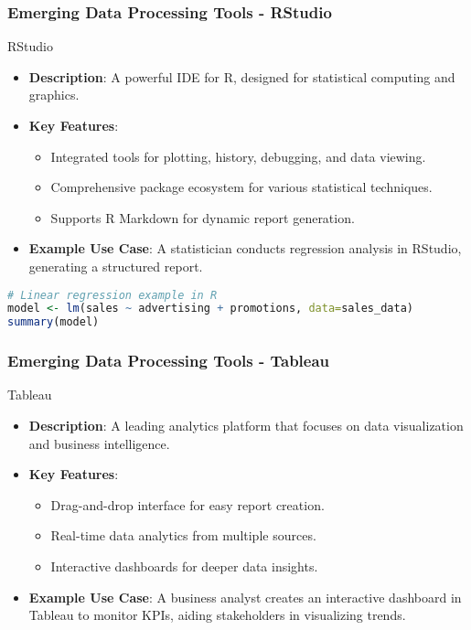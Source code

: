 \documentclass[aspectratio=169]{beamer}
\begin{document}
\begin{frame}[fragile]
    \frametitle{Emerging Data Processing Tools - RStudio}
    \begin{block}{RStudio}
        \begin{itemize}
            \item \textbf{Description}: A powerful IDE for R, designed for statistical computing and graphics.
            \item \textbf{Key Features}:
                \begin{itemize}
                    \item Integrated tools for plotting, history, debugging, and data viewing.
                    \item Comprehensive package ecosystem for various statistical techniques.
                    \item Supports R Markdown for dynamic report generation.
                \end{itemize}
            \item \textbf{Example Use Case}:
                A statistician conducts regression analysis in RStudio, generating a structured report.
        \end{itemize}
    \end{block}
    \begin{lstlisting}[language=R, caption=RStudio Example]
# Linear regression example in R
model <- lm(sales ~ advertising + promotions, data=sales_data)
summary(model)
    \end{lstlisting}
\end{frame}

\begin{frame}[fragile]
    \frametitle{Emerging Data Processing Tools - Tableau}
    \begin{block}{Tableau}
        \begin{itemize}
            \item \textbf{Description}: A leading analytics platform that focuses on data visualization and business intelligence.
            \item \textbf{Key Features}:
                \begin{itemize}
                    \item Drag-and-drop interface for easy report creation.
                    \item Real-time data analytics from multiple sources.
                    \item Interactive dashboards for deeper data insights.
                \end{itemize}
            \item \textbf{Example Use Case}:
                A business analyst creates an interactive dashboard in Tableau to monitor KPIs, aiding stakeholders in visualizing trends.
        \end{itemize}
    \end{block}
\end{frame}
\end{document}
